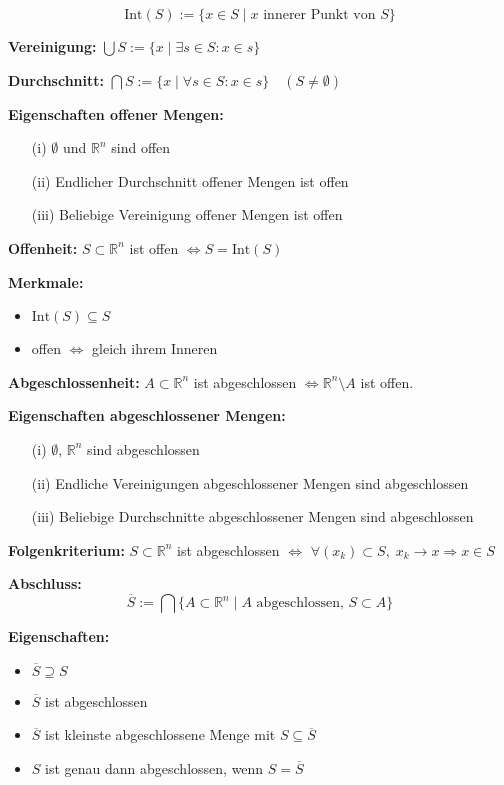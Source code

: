 \begin{itemize}
\[
\text{Int}(S) := \{x \in S \mid x \text{ innerer Punkt von } S\}
\]

\textbf{Vereinigung:} \(\displaystyle \bigcup S := \{x \mid \exists s \in S: x \in s\}\)

\textbf{Durchschnitt:} \(\displaystyle \bigcap S := \{x \mid \forall s \in S: x \in s\}\quad (S \ne \emptyset)\)


\textbf{Eigenschaften offener Mengen:}
\begin{itemize}
  \item[(i)] \(\emptyset\) und \(\mathbb{R}^n\) sind offen
  \item[(ii)] Endlicher Durchschnitt offener Mengen ist offen
  \item[(iii)] Beliebige Vereinigung offener Mengen ist offen
\end{itemize}


\textbf{Offenheit:}  
\(S \subset \mathbb{R}^n\) ist offen \(\Leftrightarrow S = \text{Int}(S)\)

\textbf{Merkmale:}
\begin{itemize}
  \item \(\text{Int}(S) \subseteq S\)
  \item offen \(\Leftrightarrow\) gleich ihrem Inneren
\end{itemize}

\textbf{Abgeschlossenheit:}  
\(A \subset \mathbb{R}^n\) ist abgeschlossen \(\Leftrightarrow \mathbb{R}^n \setminus A\) ist offen.

\textbf{Eigenschaften abgeschlossener Mengen:}
\begin{itemize}
  \item[(i)] \(\emptyset,\, \mathbb{R}^n\) sind abgeschlossen
  \item[(ii)] Endliche Vereinigungen abgeschlossener Mengen sind abgeschlossen
  \item[(iii)] Beliebige Durchschnitte abgeschlossener Mengen sind abgeschlossen
\end{itemize}

\textbf{Folgenkriterium:}  
\(S \subset \mathbb{R}^n\) ist abgeschlossen \(\Leftrightarrow\)  
\(\forall (x_k) \subset S,\; x_k \to x \Rightarrow x \in S\)

\textbf{Abschluss:}  
\[
\overline{S} := \bigcap \{A \subset \mathbb{R}^n \mid A \text{ abgeschlossen, } S \subset A\}
\]

\textbf{Eigenschaften:}
\begin{itemize}
  \item \(\overline{S} \supseteq S\)
  \item \(\overline{S}\) ist abgeschlossen
  \item \(\overline{S}\) ist kleinste abgeschlossene Menge mit \(S \subseteq \overline{S}\)
  \item \(S\) ist genau dann abgeschlossen, wenn \(S = \overline{S}\)
\end{itemize}


\end{itemize}
